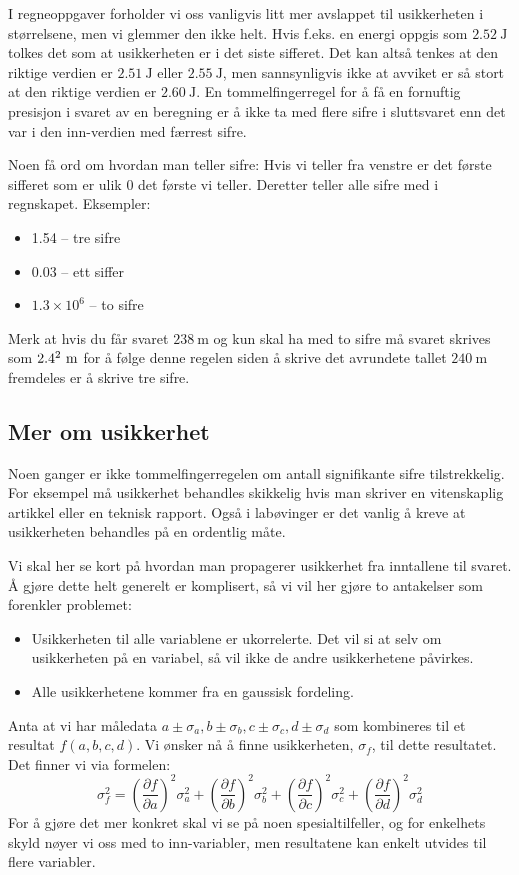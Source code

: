 \documentclass[a4paper,norsk,12pt]{book}
\begin{document}
I regneoppgaver forholder vi oss vanligvis litt mer avslappet til usikkerheten i størrelsene, men vi glemmer den ikke helt. Hvis f.eks. en energi oppgis som $2.52~\mathrm{J}$ tolkes det som at usikkerheten er i det siste sifferet. Det kan altså tenkes at den riktige verdien er $2.51~\mathrm{J}$ eller $2.55~\mathrm{J}$, men sannsynligvis ikke at avviket er så stort at den riktige verdien er $2.60~\mathrm{J}$. En tommelfingerregel for å få en fornuftig presisjon i svaret av en beregning er å ikke ta med flere sifre i sluttsvaret enn det var i den inn-verdien med færrest sifre.

Noen få ord om hvordan man teller sifre: Hvis vi teller fra venstre er det første sifferet som er ulik 0 det første vi teller. Deretter teller alle sifre med i regnskapet. Eksempler:
\begin{itemize}
	\item 1.54 -- tre sifre
	\item 0.03 -- ett siffer
	\item$1.3\times10^6$ -- to sifre
\end{itemize}
Merk at hvis du får svaret $238~\mathrm{m}$ og kun skal ha med to sifre må svaret skrives som $2.4\time10^2~\mathrm{m}$ for å følge denne regelen siden å skrive det avrundete tallet $240~\mathrm{m}$ fremdeles er å skrive tre sifre.

\subsection{Mer om usikkerhet}
Noen ganger er ikke tommelfingerregelen om antall signifikante sifre tilstrekkelig. For eksempel må usikkerhet behandles skikkelig hvis man skriver en vitenskaplig artikkel eller en teknisk rapport. Også i labøvinger er det vanlig å kreve at usikkerheten behandles på en ordentlig måte. 

Vi skal her se kort på hvordan man propagerer usikkerhet fra inntallene til svaret. Å gjøre dette helt generelt er komplisert, så vi vil her gjøre to antakelser som forenkler problemet:
\begin{itemize}
\item
Usikkerheten til alle variablene er ukorrelerte. Det vil si at selv om usikkerheten på en variabel, så vil ikke de andre 	usikkerhetene påvirkes.
\item
Alle usikkerhetene kommer fra en gaussisk fordeling. 
\end{itemize}
Anta at vi har måledata $a\pm\sigma_a,b\pm\sigma_b,c\pm\sigma_c,d\pm\sigma_d$ som kombineres til et resultat $f(a,b,c,d)$. Vi ønsker nå å finne usikkerheten, $\sigma_f$, til dette resultatet. Det finner vi via formelen:
\begin{displaymath}
	\sigma_f^2 =
	\left(\frac{\partial f}{\partial a}\right)^2\sigma_a^2 + \left(\frac{\partial f}{\partial b}\right)^2\sigma_b^2 + 
	\left(\frac{\partial f}{\partial c}\right)^2\sigma_c^2 + \left(\frac{\partial f}{\partial d}\right)^2\sigma_d^2 
\end{displaymath}
For å gjøre det mer konkret skal vi se på noen spesialtilfeller, og for enkelhets skyld nøyer vi oss med to inn-variabler, men resultatene kan enkelt utvides til flere variabler.
\end{document}
